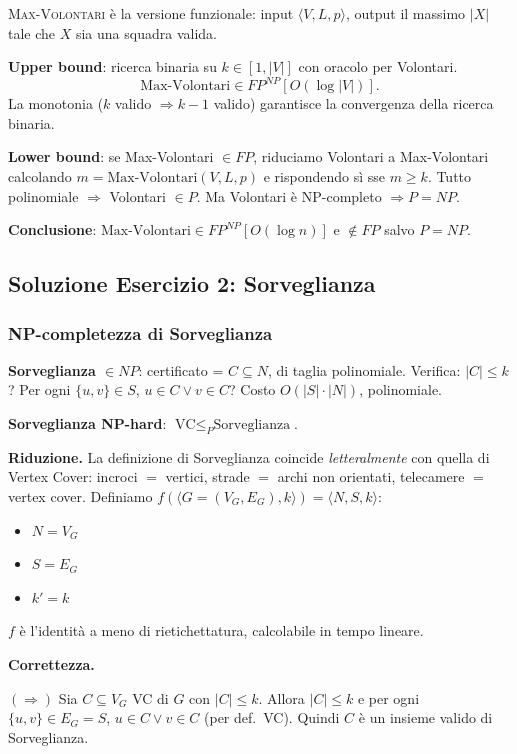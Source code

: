 \documentclass{report}
\begin{document}
\textsc{Max-Volontari} è la versione funzionale: input $\langle V, L, p\rangle$, output il massimo $|X|$ tale che $X$ sia una squadra valida.

\textbf{Upper bound}: ricerca binaria su $k \in [1, |V|]$ con oracolo per Volontari.
\[
  \text{Max-Volontari} \in FP^{NP}[O(\log |V|)].
\]
La monotonia ($k$ valido $\Rightarrow k-1$ valido) garantisce la convergenza della ricerca binaria.

\textbf{Lower bound}: se Max-Volontari $\in FP$, riduciamo Volontari a Max-Volontari calcolando $m = \text{Max-Volontari}(V, L, p)$ e rispondendo sì sse $m \geq k$. Tutto polinomiale $\Rightarrow$ Volontari $\in P$. Ma Volontari è NP-completo $\Rightarrow P = NP$.

\textbf{Conclusione}: $\text{Max-Volontari} \in FP^{NP}[O(\log n)]$ e $\notin FP$ salvo $P = NP$.

\subsection*{Soluzione Esercizio 2: Sorveglianza}

\subsubsection*{NP-completezza di Sorveglianza}

\textbf{Sorveglianza $\in NP$}: certificato = $C \subseteq N$, di taglia polinomiale. Verifica: $|C| \leq k$? Per ogni $\{u, v\} \in S$, $u \in C \vee v \in C$? Costo $O(|S| \cdot |N|)$, polinomiale.

\textbf{Sorveglianza NP-hard}: $\text{VC} \leq_P \text{Sorveglianza}$.

\textbf{Riduzione.} La definizione di Sorveglianza coincide \emph{letteralmente} con quella di Vertex Cover: incroci $=$ vertici, strade $=$ archi non orientati, telecamere $=$ vertex cover. Definiamo $f(\langle G = (V_G, E_G), k\rangle) = \langle N, S, k\rangle$:
\begin{itemize}
  \item $N = V_G$
  \item $S = E_G$
  \item $k' = k$
\end{itemize}
$f$ è l'identità a meno di rietichettatura, calcolabile in tempo lineare.

\textbf{Correttezza.}

$(\Rightarrow)$ Sia $C \subseteq V_G$ VC di $G$ con $|C| \leq k$. Allora $|C| \leq k$ e per ogni $\{u, v\} \in E_G = S$, $u \in C \vee v \in C$ (per def.\ VC). Quindi $C$ è un insieme valido di Sorveglianza.
\end{document}

